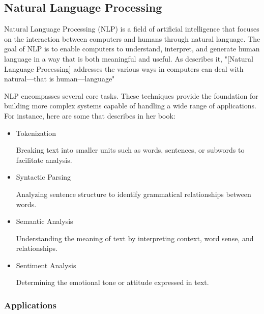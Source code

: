 \subsection{Natural Language Processing}

Natural Language Processing (NLP) is a field of artificial intelligence that focuses on the interaction between computers and humans through natural language. The goal of NLP is to enable computers to understand, interpret, and generate human language in a way that is both meaningful and useful. As \cite{book:nlp-2022} describes it, "[Natural Language Processing] addresses the various ways in computers can deal with natural—that is human—language"

NLP encompasses several core tasks. These techniques provide the foundation for building more complex systems capable of handling a wide range of applications. For instance, here are some that \cite{book:nlp-2022} describes in her book:

\begin{itemize}
    \item Tokenization
    
    Breaking text into smaller units such as words, sentences, or subwords to facilitate analysis.

    \item Syntactic Parsing 
    
    Analyzing sentence structure to identify grammatical relationships between words.

    \item Semantic Analysis
    
    Understanding the meaning of text by interpreting context, word sense, and relationships.
    
    \item Sentiment Analysis 
    
    Determining the emotional tone or attitude expressed in text. 
\end{itemize}

\subsubsection{Applications}


    

